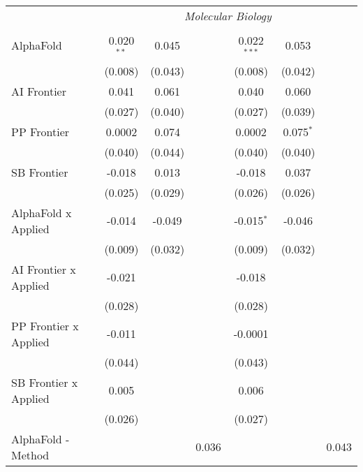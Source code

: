 \begin{tabular}{lcccccc}
 & \multicolumn{6}{c}{\textit{Molecular Biology}} \\ \\
   AlphaFold                    & 0.020$^{**}$ & 0.045   &           & 0.022$^{***}$ & 0.053       &   \\   
                                & (0.008)      & (0.043) &           & (0.008)       & (0.042)     &   \\   
   AI Frontier                  & 0.041        & 0.061   &           & 0.040         & 0.060       &   \\   
                                & (0.027)      & (0.040) &           & (0.027)       & (0.039)     &   \\   
   PP Frontier                  & 0.0002       & 0.074   &           & 0.0002        & 0.075$^{*}$ &   \\   
                                & (0.040)      & (0.044) &           & (0.040)       & (0.040)     &   \\   
   SB Frontier                  & -0.018       & 0.013   &           & -0.018        & 0.037       &   \\   
                                & (0.025)      & (0.029) &           & (0.026)       & (0.026)     &   \\   
   AlphaFold x Applied          & -0.014       & -0.049  &           & -0.015$^{*}$  & -0.046      &   \\   
                                & (0.009)      & (0.032) &           & (0.009)       & (0.032)     &   \\   
   AI Frontier x Applied        & -0.021       &         &           & -0.018        &             &   \\   
                                & (0.028)      &         &           & (0.028)       &             &   \\   
   PP Frontier x Applied        & -0.011       &         &           & -0.0001       &             &   \\   
                                & (0.044)      &         &           & (0.043)       &             &   \\   
   SB Frontier x Applied        & 0.005        &         &           & 0.006         &             &   \\   
                                & (0.026)      &         &           & (0.027)       &             &   \\   
   AlphaFold - Method           &              &         & 0.036     &               &             & 0.043\\   

\end{tabular}
